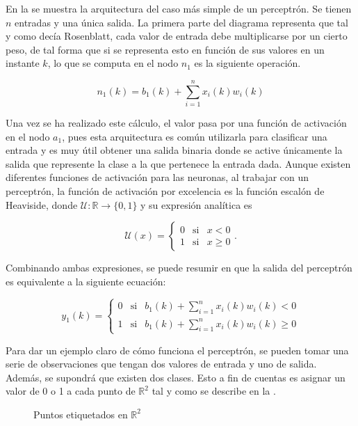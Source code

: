 		En la  se muestra la arquitectura del caso más simple de un perceptrón. Se tienen $n$ entradas y una única salida. La primera parte del diagrama representa que tal y como decía Rosenblatt, cada valor de entrada debe multiplicarse por un cierto peso, de tal forma que si se representa esto en función de sus valores en un instante $k$, lo que se computa en el nodo $n_1$ es la siguiente operación. 
		
		$$
		n_1(k) = b_1(k) + \sum_{i=1}^n x_i(k)w_i(k)
		$$
		
		Una vez se ha realizado este cálculo, el valor pasa por una función de activación en el nodo $a_1$, pues esta arquitectura es común utilizarla para clasificar una entrada y es muy útil obtener una salida binaria donde se active únicamente la salida que represente la clase a la que pertenece la entrada dada. Aunque existen diferentes funciones de activación para las neuronas, al trabajar con un perceptrón, la función de activación por excelencia es la función escalón de Heaviside, donde $\mathcal{U}: \mathbb{R} \longrightarrow \{0, 1\}$ y su expresión analítica es
		
		$$
		\mathcal{U}(x) = \left\{\begin{array}{ccc}
			0 & \text{si} & x < 0\\
			1 & \text{si} & x \geq 0
		\end{array}
		\right..
		$$
		
		Combinando ambas expresiones, se puede resumir en que la salida del perceptrón es equivalente a la siguiente ecuación: 
		
		$$
		y_1(k) = \left\{\begin{array}{ccc}
			0 & \text{si} & b_1(k) + \displaystyle\sum_{i=1}^n x_i(k)w_i(k) < 0\\
			1 & \text{si} & b_1(k) + \displaystyle\sum_{i=1}^n x_i(k)w_i(k) \geq 0
		\end{array}
		\right.
		$$
		
		Para dar un ejemplo claro de cómo funciona el perceptrón, se pueden tomar una serie de observaciones que tengan dos valores de entrada y uno de salida. Además, se supondrá que existen dos clases. Esto a fin de cuentas es asignar un valor de 0 o 1 a cada punto de $\mathbb{R}^2$ tal y como se describe en la . \\
		
		\begin{figure}[!h]
			\centering
			\caption{Puntos etiquetados en $\mathbb{R}^2$}
			\label{fig:labeled_data}
		\end{figure}
		
